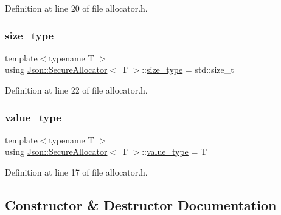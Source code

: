 Definition at line 20 of file allocator.\+h.

\hypertarget{class_json_1_1_secure_allocator_a61c258f0ae80af6982fae200b55a4dc9}{}\label{class_json_1_1_secure_allocator_a61c258f0ae80af6982fae200b55a4dc9} 
\subsubsection{\texorpdfstring{size\+\_\+type}{size\_type}}
{\footnotesize\ttfamily template$<$typename T $>$ \\
using \hyperlink{class_json_1_1_secure_allocator}{Json\+::\+Secure\+Allocator}$<$ T $>$\+::\hyperlink{class_json_1_1_secure_allocator_a61c258f0ae80af6982fae200b55a4dc9}{size\+\_\+type} =  std\+::size\+\_\+t}



Definition at line 22 of file allocator.\+h.

\hypertarget{class_json_1_1_secure_allocator_ae45a020fc6d6f3ae66394c81c4281ad8}{}\label{class_json_1_1_secure_allocator_ae45a020fc6d6f3ae66394c81c4281ad8} 
\subsubsection{\texorpdfstring{value\+\_\+type}{value\_type}}
{\footnotesize\ttfamily template$<$typename T $>$ \\
using \hyperlink{class_json_1_1_secure_allocator}{Json\+::\+Secure\+Allocator}$<$ T $>$\+::\hyperlink{class_json_1_1_secure_allocator_ae45a020fc6d6f3ae66394c81c4281ad8}{value\+\_\+type} =  T}



Definition at line 17 of file allocator.\+h.



\subsection{Constructor \& Destructor Documentation}
\hypertarget{class_json_1_1_secure_allocator_aac964c7467309331882c1ad541e4d8e4}{}\label{class_json_1_1_secure_allocator_aac964c7467309331882c1ad541e4d8e4} 
